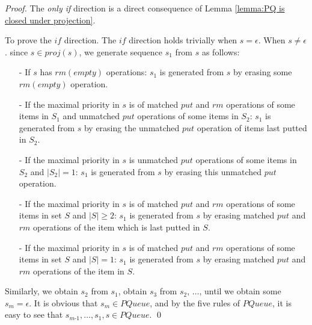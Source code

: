 \documentclass{llncs}
\begin{document}
\begin {proof}

The \textit{only if} direction is a direct consequence of Lemma \ref{lemma:PQ is closed under projection}.

To prove the $\textit{if}$ direction. The $\textit{if}$ direction holds trivially when $s = \epsilon$. When $s \neq \epsilon$. since $s \in \textit{proj}(s)$, we generate sequence $s_1$ from $s$ as follows:

\begin{itemize}
\setlength{\itemsep}{0.5pt}
\item[-] If $s$ has $\textit{rm}(\textit{empty})$ operations: $s_1$ is generated from $s$ by erasing some $\textit{rm}(\textit{empty})$ operation.

\item[-] If the maximal priority in $s$ is of matched $\textit{put}$ and $\textit{rm}$ operations of some items in $S_1$ and unmatched $\textit{put}$ operations of some items in $S_2$: $s_1$ is generated from $s$ by erasing the unmatched $\textit{put}$ operation of items last putted in $S_2$.

\item[-] If the maximal priority in $s$ is unmatched $\textit{put}$ operations of some items in $S_2$ and $\vert S_2 \vert =1$: $s_1$ is generated from $s$ by erasing this unmatched $\textit{put}$ operation.

\item[-] If the maximal priority in $s$ is of matched $\textit{put}$ and $\textit{rm}$ operations of some items in set $S$ and $\vert S \vert \geq 2$: $s_1$ is generated from $s$ by erasing matched $\textit{put}$ and $\textit{rm}$ operations of the item which is last putted in $S$.

\item[-] If the maximal priority in $s$ is of matched $\textit{put}$ and $\textit{rm}$ operations of some items in set $S$ and $\vert S \vert = 1$: $s_1$ is generated from $s$ by erasing matched $\textit{put}$ and $\textit{rm}$ operations of the item in $S$.
\end{itemize}

Similarly, we obtain $s_2$ from $s_1$, obtain $s_3$ from $s_2$, $\ldots$, until we obtain some $s_m = \epsilon$. It is obvious that $s_m \in \textit{PQueue}$, and by the five rules of $\textit{PQueue}$, it is easy to see that $s_{\textit{m-1}},\ldots,s_1,s \in \textit{PQueue}$. \qed
\end {proof}
\end{document}
